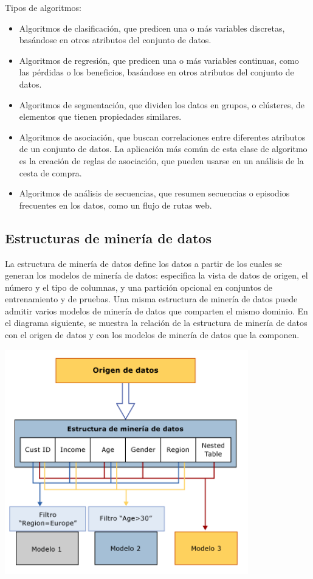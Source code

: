 \documentclass[a4paper, 11pt]{article} %
\begin{document}
Tipos de algoritmos:
\begin{itemize}
\item Algoritmos de clasificación, que predicen una o más variables discretas, basándose en otros atributos del conjunto de datos.
\item Algoritmos de regresión, que predicen una o más variables continuas, como las pérdidas o los beneficios, basándose en otros atributos del conjunto de datos.
\item Algoritmos de segmentación, que dividen los datos en grupos, o clústeres, de elementos que tienen propiedades similares.
\item Algoritmos de asociación, que buscan correlaciones entre diferentes atributos de un conjunto de datos. La aplicación más común de esta clase de algoritmo es la creación de reglas de asociación, que pueden usarse en un análisis de la cesta de compra.
\item Algoritmos de análisis de secuencias, que resumen secuencias o episodios frecuentes en los datos, como un flujo de rutas web.
\end{itemize}

\subsection*{Estructuras de minería de datos}

La estructura de minería de datos define los datos a partir de los cuales se generan los modelos de minería de datos: especifica la vista de datos de origen, el número y el tipo de columnas, y una partición opcional en conjuntos de entrenamiento y de pruebas. Una misma estructura de minería de datos puede admitir varios modelos de minería de datos que comparten el mismo dominio. En el diagrama siguiente, se muestra la relación de la estructura de minería de datos con el origen de datos y con los modelos de minería de datos que la componen.

\begin{center}
\includegraphics[width=300pt]{estructura}
\end{center}
\end{document}
